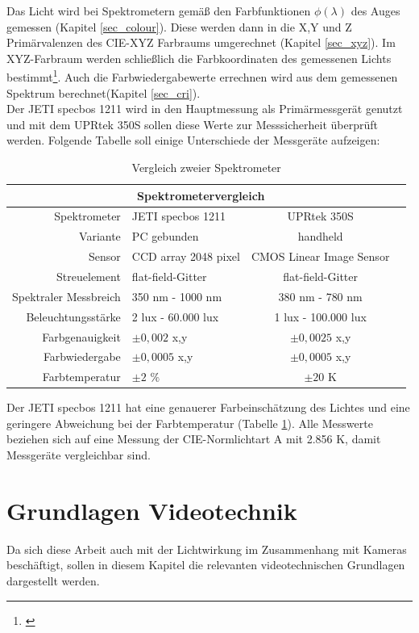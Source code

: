 Das Licht wird bei Spektrometern gemäß den Farbfunktionen $\phi(\lambda)$ des Auges gemessen (Kapitel \ref{sec_colour}). Diese werden dann in die X,Y und Z Primärvalenzen des CIE-XYZ Farbraums umgerechnet (Kapitel \ref{sec_xyz}). Im XYZ-Farbraum werden schließlich die Farbkoordinaten des gemessenen Lichts bestimmt\footnote{\cite[30]{jeti}}. Auch die Farbwiedergabewerte errechnen wird aus dem gemessenen Spektrum berechnet(Kapitel \ref{sec_cri}).\\

Der JETI specbos 1211 wird in den Hauptmessung als Primärmessgerät genutzt und mit dem UPRtek 350S sollen diese Werte zur Messsicherheit überprüft werden. Folgende Tabelle soll einige Unterschiede der Messgeräte aufzeigen:

\begin{table}[htp] 
		\centering
		\begin{tabular}{rlcc}  %
		\toprule
		\multicolumn{3}{c}{\large\sffamily Spektrometervergleich}\\ 							
		\midrule
		Spektrometer & JETI specbos 1211 & UPRtek 350S\\
		Variante & PC gebunden & handheld\\
		Sensor & CCD array 2048 pixel & CMOS Linear Image Sensor\\
		Streuelement & flat-field-Gitter & flat-field-Gitter\\
		Spektraler Messbreich & 350 nm - 1000 nm & 380 nm - 780 nm\\
		Beleuchtungsstärke & 2 lux - 60.000 lux & 1 lux - 100.000 lux\\
		Farbgenauigkeit &  $\pm 0,002$ x,y & $\pm 0,0025$ x,y\\
		Farbwiedergabe &  $\pm 0,0005$ x,y & $\pm 0,0005$ x,y\\		
		Farbtemperatur &  $\pm 2$ $\%$ & $\pm 20$ K\\
		\bottomrule
		\end{tabular}
		\caption{Vergleich zweier Spektrometer\protect\footnotemark}	
		\label{t_spek}
	\end{table}

Der JETI specbos 1211 hat eine genauerer Farbeinschätzung des Lichtes und eine geringere Abweichung bei der Farbtemperatur (Tabelle \ref{t_spek}). Alle Messwerte beziehen sich auf eine Messung der CIE-Normlichtart A mit 2.856 K, damit Messgeräte vergleichbar sind.

\chapter{Grundlagen Videotechnik}
Da sich diese Arbeit auch mit der Lichtwirkung im Zusammenhang mit Kameras beschäftigt, sollen in diesem Kapitel die relevanten videotechnischen Grundlagen dargestellt werden.
